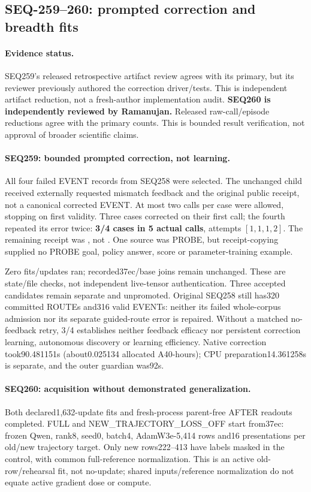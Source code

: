 \documentclass{article}
\begin{document}
\subsection{SEQ-259--260: prompted correction and breadth fits}
\label{sec:correction-breadth-fit}

\paragraph{Evidence status.}
SEQ259's released retrospective artifact review agrees with its primary, but
its reviewer previously authored the correction driver/tests. This is independent
artifact reduction, not a fresh-author implementation audit. \textbf{SEQ260 is
independently reviewed by Ramanujan.} Released raw-call/episode reductions
agree with the primary counts. This is bounded result verification, not
approval of broader scientific claims.

\paragraph{SEQ259: bounded prompted correction, not learning.}
All four failed EVENT records from SEQ258 were selected. The unchanged child
received externally requested mismatch feedback and the original public receipt,
not a canonical corrected EVENT. At most two calls per case were allowed,
stopping on first validity. Three cases corrected on their first call; the fourth
repeated its error twice: \textbf{3/4 cases in 5 actual calls}, attempts
$[1,1,1,2]$. The remaining receipt was , not
. One source was PROBE, but receipt-copying supplied no PROBE
goal, policy answer, score or parameter-training example.

Zero fits/updates ran; recorded37ec/base joins remain unchanged. These are
state/file checks, not independent live-tensor authentication. Three accepted
candidates remain separate and unpromoted. Original SEQ258 still has320 committed
ROUTEs and316 valid EVENTs: neither its failed whole-corpus admission nor its
separate guided-route error is repaired. Without a matched no-feedback retry,
3/4 establishes neither feedback efficacy nor persistent correction learning,
autonomous discovery or learning efficiency. Native correction took90.481151s
(about0.025134 allocated A40-hours); CPU preparation14.361258s is separate, and
the outer guardian was92s.

\paragraph{SEQ260: acquisition without demonstrated generalization.}
Both declared1,632-update fits and fresh-process parent-free AFTER readouts
completed. FULL and NEW\_TRAJECTORY\_LOSS\_OFF start from37ec: frozen Qwen,
rank8, seed0, batch4, AdamW3e-5,414 rows and16 presentations per old/new
trajectory target. Only new rows222--413 have labels masked in the control,
with common full-reference normalization. This is an active old-row/rehearsal
fit, not no-update; shared inputs/reference normalization do not equate active
gradient dose or compute.
\end{document}

